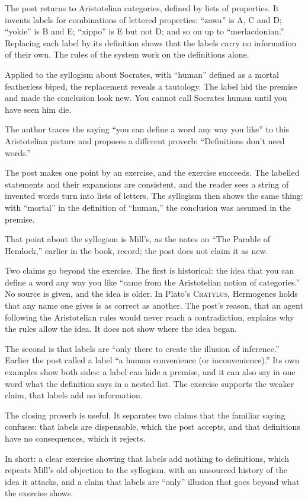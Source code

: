 \begin{afterword}
\summaryhead

The post returns to Aristotelian categories, defined by lists of properties. It invents labels for combinations of lettered properties: ``zawa'' is A, C and D; ``yokie'' is B and E; ``xippo'' is E but not D; and so on up to ``merlacdonian.'' Replacing each label by its definition shows that the labels carry no information of their own. The rules of the system work on the definitions alone.

Applied to the syllogism about Socrates, with ``human'' defined as a mortal featherless biped, the replacement reveals a tautology. The label hid the premise and made the conclusion look new. You cannot call Socrates human until you have seen him die.

The author traces the saying ``you can define a word any way you like'' to this Aristotelian picture and proposes a different proverb: ``Definitions don't need words.''

\responsehead

The post makes one point by an exercise, and the exercise succeeds. The labelled statements and their expansions are consistent, and the reader sees a string of invented words turn into lists of letters. The syllogism then shows the same thing: with ``mortal'' in the definition of ``human,'' the conclusion was assumed in the premise.

That point about the syllogism is Mill's, as the notes on ``The Parable of Hemlock,'' earlier in the book, record; the post does not claim it as new.

Two claims go beyond the exercise. The first is historical: the idea that you can define a word any way you like ``came from the Aristotelian notion of categories.'' No source is given, and the idea is older. In Plato's \textsc{Cratylus}, Hermogenes holds that any name one gives is as correct as another. The post's reason, that an agent following the Aristotelian rules would never reach a contradiction, explains why the rules allow the idea. It does not show where the idea began.

The second is that labels are ``only there to create the illusion of inference.'' Earlier the post called a label ``a human convenience (or inconvenience).'' Its own examples show both sides: a label can hide a premise, and it can also say in one word what the definition says in a nested list. The exercise supports the weaker claim, that labels add no information.

The closing proverb is useful. It separates two claims that the familiar saying confuses: that labels are dispensable, which the post accepts, and that definitions have no consequences, which it rejects.

In short: a clear exercise showing that labels add nothing to definitions, which repeats Mill's old objection to the syllogism, with an unsourced history of the idea it attacks, and a claim that labels are ``only'' illusion that goes beyond what the exercise shows.
\end{afterword}
